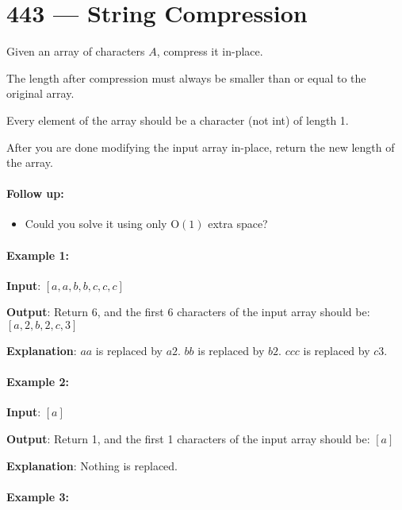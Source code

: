 \section{443 --- String Compression}
Given an array of characters $A$, compress it in-place.

The length after compression must always be smaller than or equal to the original array.

Every element of the array should be a character (not int) of length 1.

After you are done modifying the input array in-place, return the new length of the array.

 
\paragraph{Follow up:}

\begin{itemize}
\item Could you solve it using only $\mathrm{O}(1)$ extra space?
\end{itemize}

 
\paragraph{Example 1:}

\begin{flushleft}
\textbf{Input}: $[a,a,b,b,c,c,c]$

\textbf{Output}: Return 6, and the first 6 characters of the input array should be: $[a,2,b,2,c,3]$

\textbf{Explanation}: $aa$ is replaced by $a2$. $bb$ is replaced by $b2$. $ccc$ is replaced by $c3$.
 
\end{flushleft}

\paragraph{Example 2:}

\begin{flushleft}
\textbf{Input}: $[a]$

\textbf{Output}: Return 1, and the first 1 characters of the input array should be: $[a]$

\textbf{Explanation}: Nothing is replaced.

\end{flushleft}


\paragraph{Example 3:}

